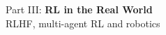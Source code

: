 \begin{frame}{}
    \LARGE Part III: \textbf{RL in the Real World}\\[0.8em]
    \normalsize RLHF, multi-agent RL and robotics
\end{frame}
